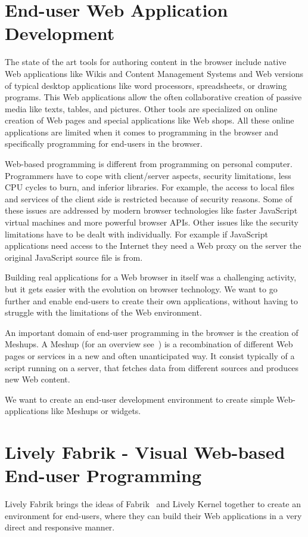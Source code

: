 \documentclass[pdftex, times, 10pt, twocolumn]{article}
\begin{document}
\section{End-user Web Application Development}
The state of the art tools for authoring content in the browser include native Web applications like Wikis and Content Management Systems and Web versions of typical desktop applications like word processors, spreadsheets, or drawing programs. This Web applications allow the often collaborative creation of passive media like texts, tables, and pictures. Other tools are specialized on online creation of Web pages and special applications like Web shops. All these online applications are limited when it comes to programming in the browser and specifically programming for end-users in the browser. 

Web-based programming is different from programming on personal computer. Programmers have to cope with client/server aspects, security limitations, less CPU cycles to burn, and inferior libraries. For example, the access to local files and services of the client side is restricted because of security reasons. Some of these issues are addressed by modern browser technologies like faster JavaScript virtual machines and more powerful browser APIs. Other issues like the security limitations have to be dealt with individually. For example if JavaScript applications need access to the Internet they need a Web proxy on the server the original JavaScript source file is from.   

Building real applications for a Web browser in itself was a challenging activity, but it gets easier with the evolution on browser technology. We want to go further and enable end-users to create their own applications, without having to struggle with the limitations of the Web environment. 

An important domain of end-user programming in the browser is the creation of Meshups.  A Meshup (for an overview see~\cite{Merrill2006MNB}) is a recombination of different Web pages or services in a new and often unanticipated way. It consist typically of a script running on a server, that fetches data from different sources and produces new Web content.  

We want to create an end-user development environment to create simple Web-applications like Meshups or widgets.   



\section{Lively Fabrik - Visual Web-based End-user Programming}
Lively Fabrik brings the ideas of Fabrik~\cite{Ingalls1988FVP,Ludolph1988FPE} and Lively Kernel together to create an environment for end-users, where they can build their Web applications in a very direct and responsive manner.  
\end{document}
